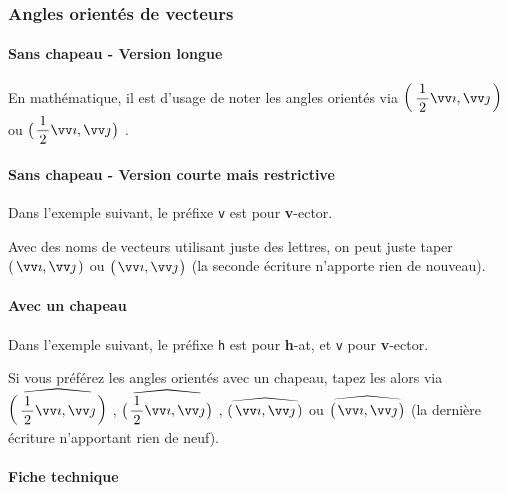 \documentclass[12pt,a4paper]{article}
\theoremstyle{definition}
\begin{document}
		\subsubsection{Angles orientés de vecteurs}

            \paragraph{Sans chapeau - Version longue}

\begin{tcblisting}{}
En mathématique, il est d'usage de noter les angles orientés via
$\displaystyle \angleorient{\frac{1}{2} \vect{i}}{\vect{j}}$
ou
$\displaystyle \angleorient*{\frac{1}{2} \vect{i}}{\vect{j}}$ .
\end{tcblisting}



            \paragraph{Sans chapeau - Version courte mais restrictive}

Dans l'exemple suivant, le préfixe \verb+v+ est pour \textbf{v}-ector.
\begin{tcblisting}{}
Avec des noms de vecteurs utilisant juste des lettres, on peut juste taper
$\displaystyle \vangleorient{i}{j}$
ou
$\displaystyle \vangleorient*{i}{j}$ (la seconde écriture n'apporte rien de nouveau).
\end{tcblisting}



            \paragraph{Avec un chapeau}

Dans l'exemple suivant, le préfixe \verb+h+ est pour \textbf{h}-at, et \verb+v+ pour \textbf{v}-ector.

\begin{tcblisting}{}
Si vous préférez les angles orientés avec un chapeau, tapez les alors via
$\displaystyle \hangleorient{\frac{1}{2} \vect{i}}{\vect{j}}$ ,
$\displaystyle \hangleorient*{\frac{1}{2} \vect{i}}{\vect{j}}$ ,
$\displaystyle \hvangleorient{i}{j}$
ou
$\displaystyle \hvangleorient*{i}{j}$ (la dernière écriture n'apportant rien de neuf).
\end{tcblisting}



            \paragraph{Fiche technique}
\end{document}
